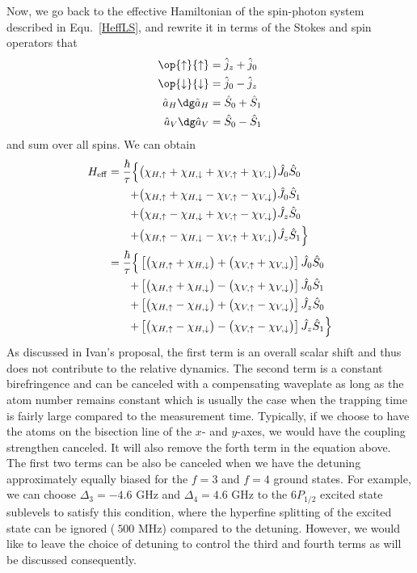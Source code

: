 \documentclass[]{report}
\begin{document}
Now, we go back to the effective Hamiltonian of the spin-photon system described in Equ.~\ref{HeffLS}, and rewrite it in terms of the Stokes and spin operators that 
\begin{align}
\op{\uparrow}{\uparrow} &= \hat{j}_z + \hat{j}_0 \\ \op{\downarrow}{\downarrow} &= \hat{j}_0 - \hat{j}_z\\
\hat{a}_H\dg \hat{a}_H &= \hat{S}_0 + \hat{S}_1\\
\hat{a}_V\dg \hat{a}_V &= \hat{S}_0 - \hat{S}_1
\end{align}
and sum over all spins. We can obtain
\begin{align}
H_{\rm eff} = \frac{\hbar}{\tau} \Big\{ & \big( \chi_{H,\uparrow} + \chi_{H,\downarrow} + \chi_{V,\uparrow} + \chi_{V,\downarrow}\big) \hat{J}_0 \hat{S}_0 \nonumber \\
+ & \big( \chi_{H, \uparrow} + \chi_{H,\downarrow} - \chi_{V,\uparrow} - \chi_{V,\downarrow} \big)  \hat{J}_0 \hat{S}_1 \nonumber \\
+ & \big( \chi_{H,\uparrow} - \chi_{H,\downarrow} + \chi_{V,\uparrow} - \chi_{V,\downarrow} \big)  \hat{J}_z \hat{S}_0 \nonumber \\
+ & \big( \chi_{H,\uparrow} - \chi_{H,\downarrow} - \chi_{V,\uparrow} + \chi_{V,\downarrow} \big)  \hat{J}_z \hat{S}_1\Big\}\\
=\frac{\hbar}{\tau} \Big\{ & \left[ \big( \chi_{H,\uparrow} + \chi_{H,\downarrow}\big) + \big(\chi_{V,\uparrow} + \chi_{V,\downarrow}\big) \right] \hat{J}_0 \hat{S}_0 \nonumber \\
+ & \left[ \big( \chi_{H, \uparrow} + \chi_{H,\downarrow}\big) - \big( \chi_{V,\uparrow} + \chi_{V,\downarrow} \big)\right]  \hat{J}_0 \hat{S}_1 \nonumber \\
+ & \left[ \big( \chi_{H,\uparrow} - \chi_{H,\downarrow}\big) + \big(\chi_{V,\uparrow} - \chi_{V,\downarrow} \big) \right] \hat{J}_z \hat{S}_0 \nonumber \\
+ & \left[ \big( \chi_{H,\uparrow} - \chi_{H,\downarrow}\big) - \big(\chi_{V,\uparrow} - \chi_{V,\downarrow} \big) \right]  \hat{J}_z \hat{S}_1\Big\}
\end{align}
As discussed in Ivan's proposal, the first term is an overall scalar shift and thus does not contribute to the relative dynamics.  The second term is a constant birefringence and can be canceled with a compensating waveplate as long as the atom number remains constant which is usually the case when the trapping time is fairly large compared to the measurement time. Typically, if we choose to have the atoms on the bisection line of the $ x $- and $ y $-axes, we would have the coupling strengthen canceled. It will also remove the forth term in the equation above. The first two terms can be also be canceled when we have the detuning approximately equally biased for the $ f=3 $ and $ f=4 $ ground states. 
For example, we  can choose $ \Delta_3=-4.6 $ GHz and $ \Delta_4=4.6 $ GHz to the $ 6P_{1/2} $ excited state sublevels to satisfy this condition, where the hyperfine splitting of the excited state can be ignored ($ ~500 $ MHz) compared to the detuning. However, we would like to leave the choice of detuning to control the third and fourth terms as will be discussed consequently. 
\end{document}
